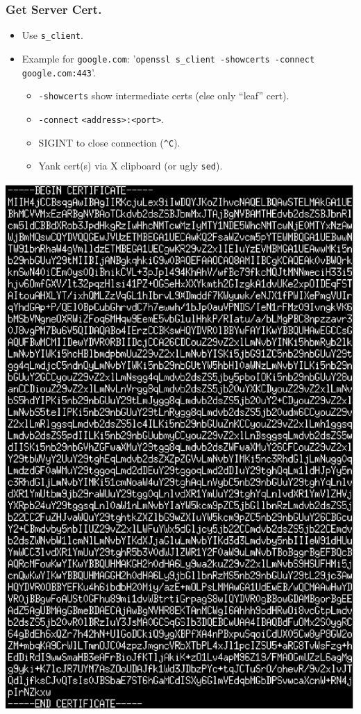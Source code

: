 \documentclass[xcolor={dvipsnames,svgnames},hyperref=dvips]{beamer}
\begin{document}
	\begin{frame}
		\frametitle{Get Server Cert.}
		\begin{itemize}
			\item Use \texttt{s\_client}.
			\item Example for \texttt{google.com}: '\texttt{openssl s\_client -showcerts -connect google.com:443}'.
			\begin{itemize}
				\item \texttt{-showcerts} show intermediate certs (else only ``leaf'' cert).
				\item \texttt{-connect} \texttt{<address>:<port>}.
				\item SIGINT to close connection (\texttt{\textasciicircum C}).
				\item Yank cert(s) via X clipboard (or ugly \texttt{sed}).
			\end{itemize}
		\end{itemize}
	\end{frame}
	\begin{frame}
		\center\includegraphics[scale=0.4]{pemcert.ps}
	\end{frame}
\end{document}
